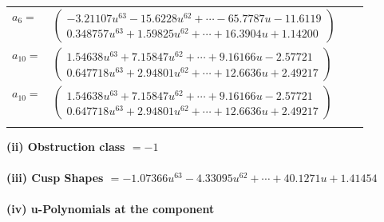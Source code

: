 \documentclass[1p]{elsarticle_modified}
\theoremstyle{definition}
\begin{document}
\begin{tabular}{m{7pt} m{180pt} m{7pt} m{180pt} }
\flushright $a_{6}=$&$\begin{pmatrix}-3.21107 u^{63}-15.6228 u^{62}+\cdots-65.7787 u-11.6119\\0.348757 u^{63}+1.59825 u^{62}+\cdots+16.3904 u+1.14200\end{pmatrix}$ \\
\flushright $a_{10}=$&$\begin{pmatrix}1.54638 u^{63}+7.15847 u^{62}+\cdots+9.16166 u-2.57721\\0.647718 u^{63}+2.94801 u^{62}+\cdots+12.6636 u+2.49217\end{pmatrix}$\\ \flushright $a_{10}=$&$\begin{pmatrix}1.54638 u^{63}+7.15847 u^{62}+\cdots+9.16166 u-2.57721\\0.647718 u^{63}+2.94801 u^{62}+\cdots+12.6636 u+2.49217\end{pmatrix}$\\&\end{tabular}
\flushleft \textbf{(ii) Obstruction class $= -1$}\\~\\
\flushleft \textbf{(iii) Cusp Shapes $= -1.07366 u^{63}-4.33095 u^{62}+\cdots+40.1271 u+1.41454$}\\~\\
\newpage\renewcommand{\arraystretch}{1}
\flushleft \textbf{(iv) u-Polynomials at the component}\newline \\
\end{document}
